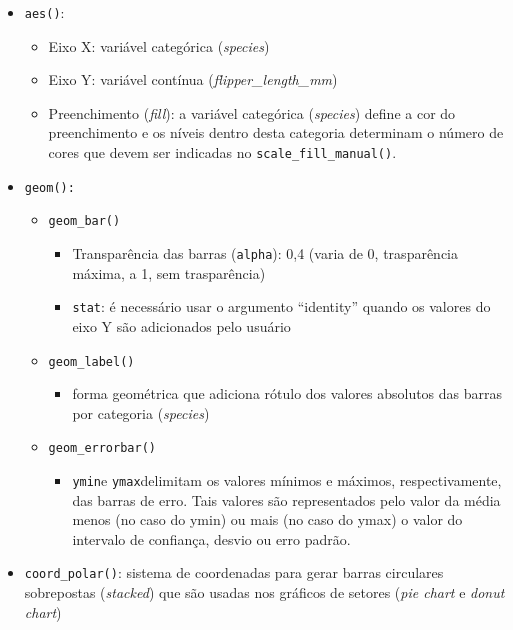 \documentclass[
]{book}
\providecommand{\tightlist}{%
  \setlength{\itemsep}{0pt}\setlength{\parskip}{0pt}}
\begin{document}
\begin{itemize}
\item
  \texttt{aes()}:

  \begin{itemize}
  \item
    Eixo X: variável categórica (\emph{species})
  \item
    Eixo Y: variável contínua (\emph{flipper\_length\_mm})
  \item
    Preenchimento (\emph{fill}): a variável categórica (\emph{species}) define a cor do preenchimento e os níveis dentro desta categoria determinam o número de cores que devem ser indicadas no \texttt{scale\_fill\_manual()}.
  \end{itemize}
\item
  \texttt{geom():}

  \begin{itemize}
  \item
    \texttt{geom\_bar()}

    \begin{itemize}
    \item
      Transparência das barras (\texttt{alpha}): 0,4 (varia de 0, trasparência máxima, a 1, sem trasparência)
    \item
      \texttt{stat}: é necessário usar o argumento ``identity'' quando os valores do eixo Y são adicionados pelo usuário
    \end{itemize}
  \item
    \texttt{geom\_label()}

    \begin{itemize}
    \tightlist
    \item
      forma geométrica que adiciona rótulo dos valores absolutos das barras por categoria (\emph{species})
    \end{itemize}
  \item
    \texttt{geom\_errorbar()}

    \begin{itemize}
    \tightlist
    \item
      \texttt{ymin}e \texttt{ymax}delimitam os valores mínimos e máximos, respectivamente, das barras de erro. Tais valores são representados pelo valor da média menos (no caso do ymin) ou mais (no caso do ymax) o valor do intervalo de confiança, desvio ou erro padrão.
    \end{itemize}
  \end{itemize}
\item
  \texttt{coord\_polar()}: sistema de coordenadas para gerar barras circulares sobrepostas (\emph{stacked}) que são usadas nos gráficos de setores (\emph{pie chart} e \emph{donut chart})


\end{itemize}
\end{document}

